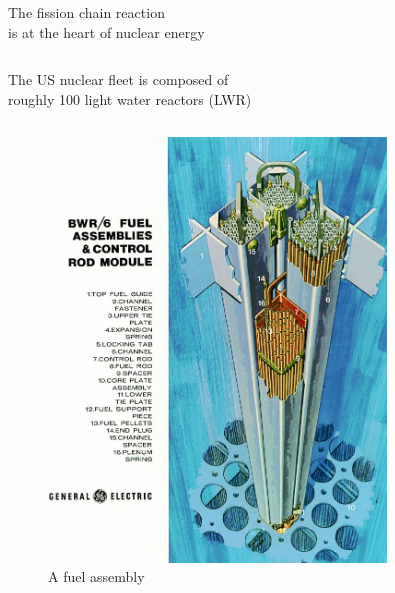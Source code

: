 \documentclass{beamer}
\begin{document}
\begin{frame}{The fission chain reaction \\ is at the heart of nuclear energy}
\begin{columns}[T]
            \end{columns}

        \end{frame}

        \begin{frame}{The US nuclear fleet is composed of \\ roughly 100 light water reactors (LWR)}

            \begin{columns}[T]

                \begin{column}{0.5\textwidth}
                    \begin{figure}
                        \centering
                        \includegraphics[width=0.8\textwidth]{./img/bwrFuel.png}
                        \caption*{A fuel assembly}
                    \end{figure}
                \end{column}


\end{columns}
\end{frame}
\end{document}
